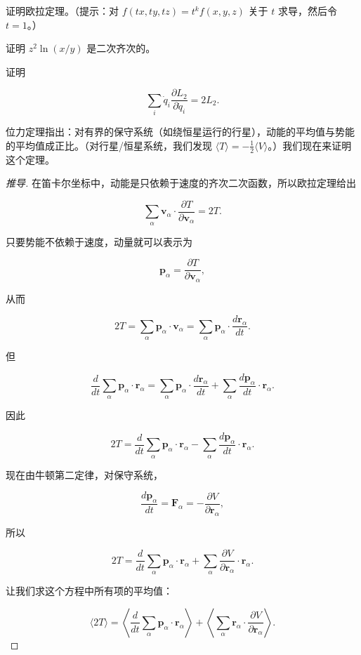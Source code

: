 \begin{example}[例题 4.8]
证明欧拉定理。（提示：对 $f(tx, ty, tz) = t^k f(x, y, z)$ 关于 $t$ 求导，然后令 $t = 1$。）
\end{example}
\begin{example}[例题 4.9]
证明 $z^2\ln(x/y)$ 是二次齐次的。
\end{example}
\begin{example}[例题 4.10]
证明

\[
\sum_i\dot{q}_i\frac{\partial L_2}{\partial \dot{q}_i} = 2L_2.
\]
\end{example}
位力定理指出：对有界的保守系统（如绕恒星运行的行星），动能的平均值与势能的平均值成正比。（对行星/恒星系统，我们发现 $\langle T\rangle = -\frac{1}{2}\langle V\rangle$。）我们现在来证明这个定理。
\begin{proof}[推导]
在笛卡尔坐标中，动能是只依赖于速度的齐次二次函数，所以欧拉定理给出

\[
\sum_{\alpha}\mathbf{v}_\alpha\cdot\frac{\partial T}{\partial \mathbf{v}_\alpha} = 2T.
\]

只要势能不依赖于速度，动量就可以表示为

\[
\mathbf{p}_\alpha = \frac{\partial T}{\partial \mathbf{v}_\alpha},
\]

从而

\[
2T = \sum_{\alpha}\mathbf{p}_\alpha\cdot\mathbf{v}_\alpha = \sum_{\alpha}\mathbf{p}_\alpha\cdot\frac{d\mathbf{r}_\alpha}{dt}.
\]

但

\[
\frac{d}{dt}\sum_{\alpha}\mathbf{p}_\alpha\cdot\mathbf{r}_\alpha = \sum_{\alpha}\mathbf{p}_\alpha\cdot\frac{d\mathbf{r}_\alpha}{dt} + \sum_{\alpha}\frac{d\mathbf{p}_\alpha}{dt}\cdot\mathbf{r}_\alpha.
\]

因此

\[
2T = \frac{d}{dt}\sum_{\alpha}\mathbf{p}_\alpha\cdot\mathbf{r}_\alpha - \sum_{\alpha}\frac{d\mathbf{p}_\alpha}{dt}\cdot\mathbf{r}_\alpha.
\]

现在由牛顿第二定律，对保守系统，

\[
\frac{d\mathbf{p}_\alpha}{dt} = \mathbf{F}_\alpha = -\frac{\partial V}{\partial \mathbf{r}_\alpha},
\]

所以

\[
2T = \frac{d}{dt}\sum_{\alpha}\mathbf{p}_\alpha\cdot\mathbf{r}_\alpha + \sum_{\alpha}\frac{\partial V}{\partial \mathbf{r}_\alpha}\cdot\mathbf{r}_\alpha.
\]

让我们求这个方程中所有项的平均值：

\[
\langle 2T\rangle = \left\langle\frac{d}{dt}\sum_{\alpha}\mathbf{p}_\alpha\cdot\mathbf{r}_\alpha\right\rangle + \left\langle\sum_{\alpha}\mathbf{r}_\alpha\cdot\frac{\partial V}{\partial \mathbf{r}_\alpha}\right\rangle.
\]


\end{proof}
